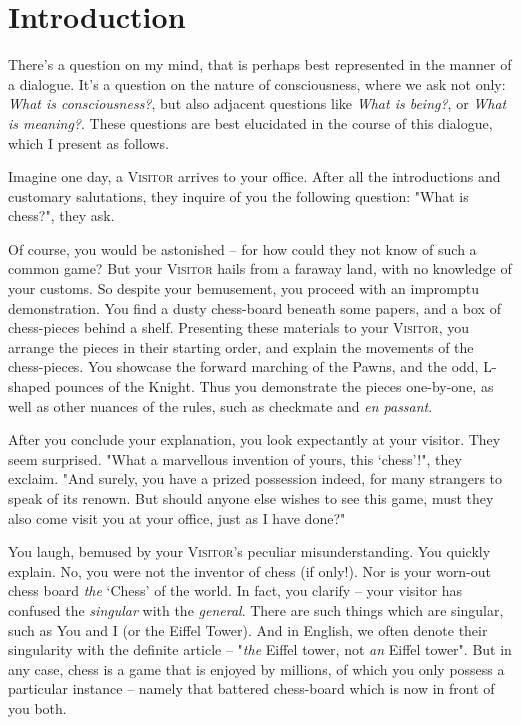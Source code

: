 \section{Introduction}

\noindent
There's a question on my mind, that is perhaps best represented in the manner of a dialogue. It's a question on the nature of consciousness, where we ask not only: \emph{What is consciousness?}, but also adjacent questions like \emph{What is being?}, or \emph{What is meaning?}. These questions are best elucidated in the course of this dialogue, which I present as follows.



Imagine one day, a \textsc{Visitor} arrives to your office. After all the introductions and customary salutations, they inquire of you the following question: "What is chess?", they ask.

Of course, you would be astonished -- for how could they not know of such a common game? But your \textsc{Visitor} hails from a faraway land, with no knowledge of your customs. So despite your bemusement, you proceed with an impromptu demonstration. You find a dusty chess-board beneath some papers, and a box of chess-pieces behind a shelf. Presenting these materials to your \textsc{Visitor}, you arrange the pieces in their starting order, and explain the movements of the chess-pieces. You showcase the forward marching of the Pawns, and the odd, L-shaped pounces of the Knight. Thus you demonstrate the pieces one-by-one, as well as other nuances of the rules, such as checkmate and \emph{en passant}.

After you conclude your explanation, you look expectantly at your visitor. They seem surprised. "What a marvellous invention of yours, this `chess'!", they exclaim. "And surely, you have a prized possession indeed, for many strangers to speak of its renown. But should anyone else wishes to see this game, must they also come visit you at your office, just as I have done?"

You laugh, bemused by your \textsc{Visitor}'s peculiar misunderstanding. You quickly explain. No, you were not the inventor of chess (if only!). Nor is your worn-out chess board \emph{the} `Chess' of the world. In fact, you clarify -- your visitor has confused the \emph{singular} with the \emph{general}. There are such things which are singular, such as You and I (or the Eiffel Tower). And in English, we often denote their singularity with the definite article -- "\emph{the} Eiffel tower, not \emph{an} Eiffel tower". But in any case, chess is a game that is enjoyed by millions, of which you only possess a particular instance -- namely that battered chess-board which is now in front of you both.

